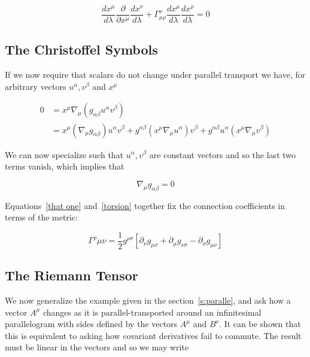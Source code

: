 \begin{equation}
\label{eq:geodesic}
\frac{d x^\mu}{d\lambda}
  \frac{\partial }{\partial x^\mu}
  \frac{d x^\nu}{d\lambda}  
+ \Gamma^\nu_{\mu\rho} 
\frac{d x^\mu}{d\lambda}
\frac{d x^\rho}{d\lambda} = 0
\end{equation}

\subsection{The Christoffel Symbols}

If we now require that scalars do not change under parallel transport
we have, for arbitrary vectors $u^\alpha, v^\beta$ and $x^\mu$

\begin{align*}
0 &= x^\mu \nabla_\mu (g_{\alpha\beta} u^\alpha v^\beta) \\
&= x^\mu (\nabla_\mu g_{\alpha\beta}) u^\alpha v^\beta
+ g^{\alpha\beta} (x^\mu \nabla_\mu u^\alpha) v^\beta
+ g^{\alpha\beta} u^\alpha (x^\mu \nabla_\mu v^\beta)
\end{align*}

We can now specialize such that $u^\alpha, v^\beta$ are constant
vectors and so the last two terms vanish, which implies that

\begin{equation}
\nabla_\mu g_{\alpha\beta} = 0
\end{equation}

Equations~\ref{that one} and~\ref{torsion} together fix the
connection coefficients in terms of the metric:

\begin{equation}
\Gamma^{\rho}{\mu\nu}
= \frac{1}{2} g^{\rho\sigma}\left[
\partial_\nu g_{\mu\sigma}
+ \partial_\mu g_{\nu\sigma}
- \partial_\sigma g_{\mu\nu}
\right]
\end{equation}


\subsection{The Riemann Tensor}

We now generalize the example given in the section~\ref{s:paralle},
and ask how a vector $A^\mu$ changes as it is parallel-transported
around an infinitesimal parallelogram with sides defined by the
vectors $A^\mu$ and $B^\nu$.  It can be shown that this is equivalent
to asking how covariant derivatives fail to commute.  The result must
be linear in the vectors and so we may write


